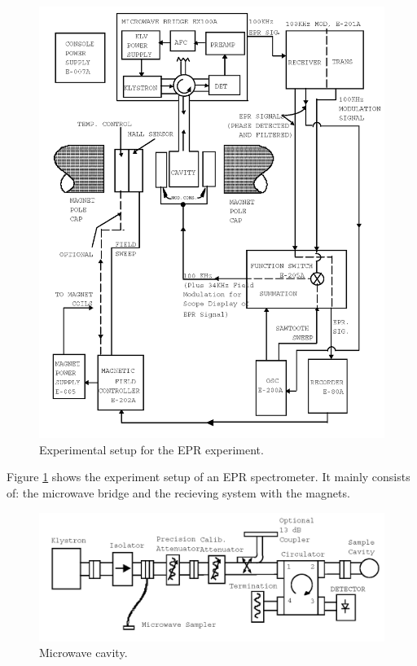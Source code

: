 \documentclass{article}
\begin{document}
\begin{figure}[h]
	\centering
	\includegraphics[width=\textwidth]{Figures/Intro/EPR.png}
	\caption{Experimental setup for the EPR experiment. \cite{physicsdepartmentuiuc_1999_electron}}
	\label{fig:setup}
\end{figure}

Figure \ref{fig:setup} shows the experiment setup of an EPR spectrometer. It mainly consists of: the microwave bridge and the recieving system with the magnets.

\pagebreak{}

\begin{figure}[h]
	\centering
	\includegraphics[width=\textwidth]{Figures/Intro/Microwave_Cavity.png}
	\caption{Microwave cavity. \cite{physicsdepartmentuiuc_1999_electron}}
	\label{fig:microwave_cavity}
\end{figure}
\end{document}
